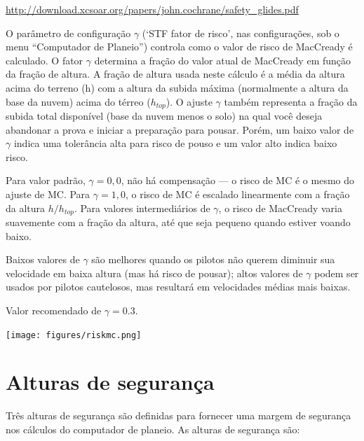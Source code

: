 \url{http://download.xcsoar.org/papers/john.cochrane/safety_glides.pdf}

O parâmetro de configuração $\gamma$ (‘STF fator de risco’, nas configurações, sob o menu “Computador de Planeio”) controla como o valor de risco de MacCready é calculado.  O fator $\gamma$ determina a fração do valor atual de MacCready em função da fração de altura.  A fração de altura usada neste cálculo é a média da altura acima do terreno (h) com a altura da subida máxima (normalmente a altura da base da nuvem) acima do térreo  ($h_{top}$).  O ajuste $\gamma$ também representa a fração da subida total disponível (base da nuvem menos o solo) na qual você deseja abandonar a prova e iniciar a preparação para pousar.  Porém, um baixo valor de $\gamma$ indica uma tolerância alta para risco de pouso e um valor alto indica baixo risco.

  Para valor padrão, $\gamma=0,0$, não há compensação ---
o risco de MC é o mesmo do ajuste de MC.  Para $\gamma=1,0$,  o risco de MC é escalado linearmente com a fração da altura $h/h_{top}$.
  Para valores intermediários de $\gamma$, o risco de MacCready varia suavemente com a fração da altura, até que seja pequeno quando estiver voando baixo.

 Baixos valores de $\gamma$  são melhores quando os pilotos não querem diminuir sua velocidade em baixa altura (mas há risco de pousar);  altos valores de $\gamma$ podem ser usados por pilotos cautelosos, mas resultará em velocidades médias mais baixas.

 Valor recomendado de $\gamma=0.3$.

\begin{center}
\texttt{[image: figures/riskmc.png]}
\end{center}


\section{Alturas de segurança}\label{sec:safety-heights}

Três alturas de segurança são definidas para fornecer uma margem de segurança nos cálculos do computador de planeio.  
As alturas de segurança são:

